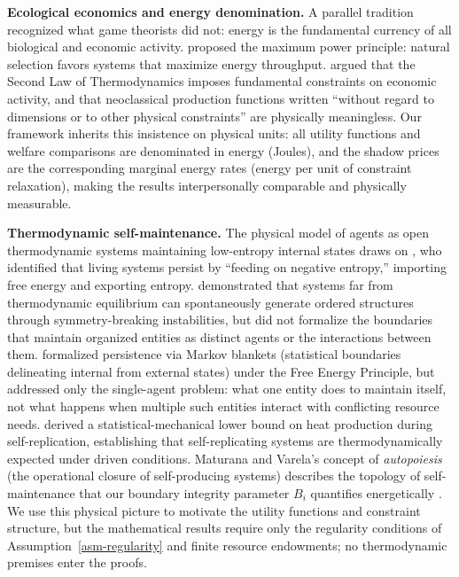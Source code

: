 \documentclass[11pt]{article}
\theoremstyle{plain}
\theoremstyle{definition}
\theoremstyle{remark}
\begin{document}
\textbf{Ecological economics and energy denomination.} A parallel
tradition recognized what game theorists did not: energy is the
fundamental currency of all biological and economic activity.
\citet{Lotka1922} proposed the maximum power principle: natural
selection favors systems that maximize energy throughput.
\citet{GeorgescuRoegen1971} argued that the Second Law of Thermodynamics
imposes fundamental constraints on economic activity, and that
neoclassical production functions written ``without regard to dimensions
or to other physical constraints'' \citep{GeorgescuRoegen1979} are
physically meaningless. Our framework inherits this insistence on
physical units: all utility functions and welfare comparisons are
denominated in energy (Joules), and the shadow prices are the
corresponding marginal energy rates (energy per unit of constraint
relaxation), making the results interpersonally comparable and
physically measurable.

\textbf{Thermodynamic self-maintenance.} The physical model of agents as
open thermodynamic systems maintaining low-entropy internal states draws
on \citet{Schrodinger1944}, who identified that living systems persist
by ``feeding on negative entropy,'' importing free energy and exporting
entropy. \citet{Prigogine1978} demonstrated that systems far from
thermodynamic equilibrium can spontaneously generate ordered structures
through symmetry-breaking instabilities, but did not formalize the
boundaries that maintain organized entities as distinct agents or the
interactions between them. \citet{Friston2013} formalized persistence
via Markov blankets (statistical boundaries delineating internal from
external states) under the Free Energy Principle, but addressed only the
single-agent problem: what one entity does to maintain itself, not what
happens when multiple such entities interact with conflicting resource
needs. \citet{England2013} derived a statistical-mechanical lower bound
on heat production during self-replication, establishing that
self-replicating systems are thermodynamically expected under driven
conditions. Maturana and Varela's concept of \emph{autopoiesis} (the
operational closure of self-producing systems) describes the topology of
self-maintenance that our boundary integrity parameter \(B_i\)
quantifies energetically \citep{Maturana1980}. We use this physical
picture to motivate the utility functions and constraint structure, but
the mathematical results require only the regularity conditions of
Assumption~\ref{asm-regularity} and finite resource endowments; no
thermodynamic premises enter the proofs.
\end{document}
